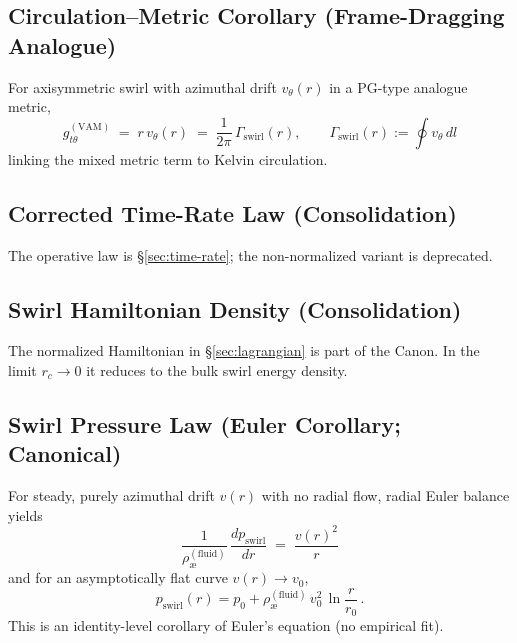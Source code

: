 \documentclass[11pt,a4paper]{article}
\newcommand{\aeFluid}{\rho_{\text{\ae}}^{(\text{fluid})}}
\newcommand{\rc}{r_c}
\begin{document}
    \subsection{Circulation–Metric Corollary (Frame-Dragging Analogue)}
    \label{sec:metric-corr}
    For axisymmetric swirl with azimuthal drift $v_\theta(r)$ in a PG-type analogue metric,
    \[
        \boxed{\, g^{(\mathrm{VAM})}_{t\theta} \;=\; r\,v_\theta(r) \;=\; \frac{1}{2\pi}\,\Gamma_{\text{swirl}}(r),\qquad
        \Gamma_{\text{swirl}}(r):=\oint v_\theta\,dl \,}
    \]
    linking the mixed metric term to Kelvin circulation. \cite{Painleve1921,Gullstrand1922,Unruh1981,Visser1998,Kerr1963}

    \subsection{Corrected Time-Rate Law (Consolidation)}
    \label{sec:timerate-consolidation}
    The operative law is \S\ref{sec:time-rate}; the non-normalized variant is deprecated.

    \subsection{Swirl Hamiltonian Density (Consolidation)}
    \label{sec:Hamiltonian-consolidation}
    The normalized Hamiltonian in \S\ref{sec:lagrangian} is part of the Canon. In the limit $\rc\to 0$ it reduces to the bulk swirl energy density. \cite{Batchelor1967,LandauFluids}

    \subsection{Swirl Pressure Law (Euler Corollary; Canonical)}
    \label{sec:darkpressure}
    For steady, purely azimuthal drift $v(r)$ with no radial flow, radial Euler balance yields
    \[
        \boxed{\, \frac{1}{\aeFluid}\,\frac{dp_{\text{swirl}}}{dr} \;=\; \frac{v(r)^{2}}{r} \,}
    \]
    and for an asymptotically flat curve $v(r)\to v_0$,
    \[
        p_{\text{swirl}}(r) = p_0 + \aeFluid\,v_0^2\,\ln\!\frac{r}{r_0}\,.
    \]
    This is an identity-level corollary of Euler’s equation (no empirical fit). \cite{Batchelor1967,LandauFluids}
\end{document}
